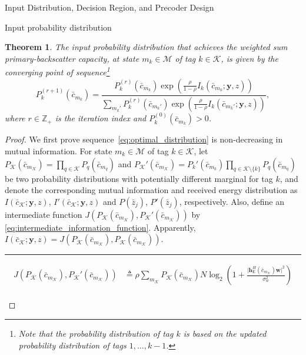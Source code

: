 \documentclass[journal]{IEEEtran}
\newtheorem{theorem}{Theorem}
\begin{document}
\begin{section}{Input Distribution, Decision Region, and Precoder Design}
\begin{subsection}{Input probability distribution}
			\begin{theorem}
				The input probability distribution that achieves the weighted sum primary-backscatter capacity, at state $m_k \in \mathcal{M}$ of tag $k \in \mathcal{K}$, is given by the converging point of sequence\footnote{Note that the probability distribution of tag $k$ is based on the updated probability distribution of tags $1,\ldots,k-1$.}
				\begin{equation}
					P_k^{(r+1)}(\bar{c}_{m_k}) = \frac{P_k^{(r)}(\bar{c}_{m_k}) \exp \left( \frac{\rho}{1 - \rho} I_k(\bar{c}_{m_k};\boldsymbol{y},z) \right)}{\sum_{m_k'} P_k^{(r)}(\bar{c}_{m_k'}) \exp \left( \frac{\rho}{1 - \rho} I_k(\bar{c}_{m_k'};\boldsymbol{y},z) \right)},
					\label{eq:optimal_distribution}
				\end{equation}
				where $r \in \mathbb{Z}_+$ is the iteration index and $P_k^{(0)}(\bar{c}_{m_k}) > 0$.
				\label{th:optimal_distribution}
			\end{theorem}
			\begin{proof}
				We first prove sequence~\eqref{eq:optimal_distribution} is non-decreasing in mutual information. For state $m_k \in \mathcal{M}$ of tag $k \in \mathcal{K}$, let $P_{\mathcal{K}}(\bar{c}_{m_{\mathcal{K}}}) = \prod_{q \in \mathcal{K}} P_q(\bar{c}_{m_q})$ and $P_{\mathcal{K}}'(\bar{c}_{m_{\mathcal{K}}}) = P_k'(\bar{c}_{m_k}) \prod_{q \in \mathcal{K} \setminus \{k\}} P_q(\bar{c}_{m_q})$ be two probability distributions with potentially different marginal for tag $k$, and denote the corresponding mutual information and received energy distribution as $I(\bar{c}_{\mathcal{K}};\boldsymbol{y},z)$, $I'(\bar{c}_{\mathcal{K}};\boldsymbol{y},z)$ and $P(\bar{z}_j)$, $P'(\bar{z}_j)$, respectively. Also, define an intermediate function $J \left( P_{\mathcal{K}}(\bar{c}_{m_{\mathcal{K}}}),P_{\mathcal{K}}'(\bar{c}_{m_{\mathcal{K}}}) \right)$ by \eqref{eq:intermediate_information_function}. Apparently, $I(\bar{c}_{\mathcal{K}};\boldsymbol{y},z) = J \left( P_{\mathcal{K}}(\bar{c}_{m_{\mathcal{K}}}),P_{\mathcal{K}}(\bar{c}_{m_{\mathcal{K}}}) \right)$.
				\begin{figure*}[!b]
					\hrule
					\begin{align}
						J \left( P_{\mathcal{K}}(\bar{c}_{m_{\mathcal{K}}}),P_{\mathcal{K}}'(\bar{c}_{m_{\mathcal{K}}}) \right)
						& \triangleq \rho \sum_{m_{\mathcal{K}}} P_{\mathcal{K}}(\bar{c}_{m_{\mathcal{K}}}) N \log_2 \left(1 + \frac{\lvert \boldsymbol{h}_{\mathrm{E}}^H(\bar{c}_{m_{\mathcal{K}}}) \boldsymbol{w} \rvert^2}{\sigma_w^2}\right)\nonumber\\

\end{align}
\end{figure*}
\end{proof}
\end{subsection}
\end{section}
\end{document}
